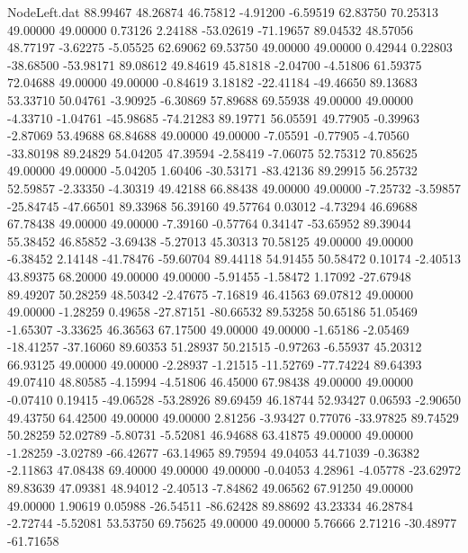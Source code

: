 \begin{filecontents}{NodeLeft.dat}
  88.99467   48.26874   46.75812    -4.91200   -6.59519   62.83750   70.25313   49.00000   49.00000    0.73126    2.24188  -53.02619  -71.19657
  89.04532   48.57056   48.77197    -3.62275   -5.05525   62.69062   69.53750   49.00000   49.00000    0.42944    0.22803  -38.68500  -53.98171
  89.08612   49.84619   45.81818    -2.04700   -4.51806   61.59375   72.04688   49.00000   49.00000   -0.84619    3.18182  -22.41184  -49.46650
  89.13683   53.33710   50.04761    -3.90925   -6.30869   57.89688   69.55938   49.00000   49.00000   -4.33710   -1.04761  -45.98685  -74.21283
  89.19771   56.05591   49.77905    -0.39963   -2.87069   53.49688   68.84688   49.00000   49.00000   -7.05591   -0.77905   -4.70560  -33.80198
  89.24829   54.04205   47.39594    -2.58419   -7.06075   52.75312   70.85625   49.00000   49.00000   -5.04205    1.60406  -30.53171  -83.42136
  89.29915   56.25732   52.59857    -2.33350   -4.30319   49.42188   66.88438   49.00000   49.00000   -7.25732   -3.59857  -25.84745  -47.66501
  89.33968   56.39160   49.57764     0.03012   -4.73294   46.69688   67.78438   49.00000   49.00000   -7.39160   -0.57764    0.34147  -53.65952
  89.39044   55.38452   46.85852    -3.69438   -5.27013   45.30313   70.58125   49.00000   49.00000   -6.38452    2.14148  -41.78476  -59.60704
  89.44118   54.91455   50.58472     0.10174   -2.40513   43.89375   68.20000   49.00000   49.00000   -5.91455   -1.58472    1.17092  -27.67948
  89.49207   50.28259   48.50342    -2.47675   -7.16819   46.41563   69.07812   49.00000   49.00000   -1.28259    0.49658  -27.87151  -80.66532
  89.53258   50.65186   51.05469    -1.65307   -3.33625   46.36563   67.17500   49.00000   49.00000   -1.65186   -2.05469  -18.41257  -37.16060
  89.60353   51.28937   50.21515    -0.97263   -6.55937   45.20312   66.93125   49.00000   49.00000   -2.28937   -1.21515  -11.52769  -77.74224
  89.64393   49.07410   48.80585    -4.15994   -4.51806   46.45000   67.98438   49.00000   49.00000   -0.07410    0.19415  -49.06528  -53.28926
  89.69459   46.18744   52.93427     0.06593   -2.90650   49.43750   64.42500   49.00000   49.00000    2.81256   -3.93427    0.77076  -33.97825
  89.74529   50.28259   52.02789    -5.80731   -5.52081   46.94688   63.41875   49.00000   49.00000   -1.28259   -3.02789  -66.42677  -63.14965
  89.79594   49.04053   44.71039    -0.36382   -2.11863   47.08438   69.40000   49.00000   49.00000   -0.04053    4.28961   -4.05778  -23.62972
  89.83639   47.09381   48.94012    -2.40513   -7.84862   49.06562   67.91250   49.00000   49.00000    1.90619    0.05988  -26.54511  -86.62428
  89.88692   43.23334   46.28784    -2.72744   -5.52081   53.53750   69.75625   49.00000   49.00000    5.76666    2.71216  -30.48977  -61.71658

\end{filecontents}
